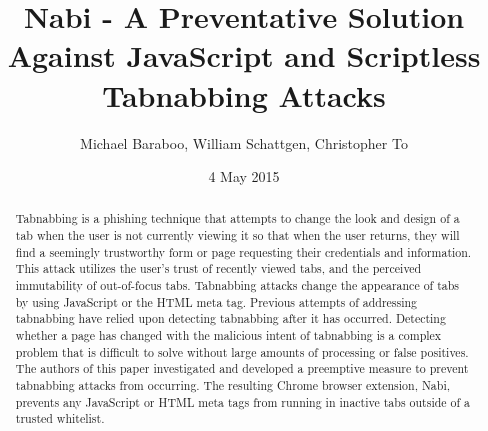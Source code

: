 \documentclass[12pt]{article}
\title{Nabi - A Preventative Solution Against JavaScript and Scriptless Tabnabbing Attacks}
\author{Michael Baraboo, William Schattgen, Christopher To}
\date{4 May 2015}
\begin{document}
\maketitle

\thispagestyle{empty}

\begin{abstract}
Tabnabbing is a phishing technique that attempts to change the look and design of a tab when the user is not currently viewing it so that when the user returns, they will find a seemingly trustworthy form or page requesting their credentials and information.  
This attack utilizes the user's trust of recently viewed tabs, and the perceived immutability of out-of-focus tabs.
Tabnabbing attacks change the appearance of tabs by using JavaScript or the HTML meta tag.  
Previous attempts of addressing tabnabbing have relied upon detecting tabnabbing after it has occurred.  
Detecting whether a page has changed with the malicious intent of tabnabbing is a complex problem that is difficult to solve without large amounts of processing or false positives.  
The authors of this paper investigated and developed a preemptive measure to prevent tabnabbing attacks from occurring.  
The resulting Chrome browser extension, Nabi, prevents any JavaScript or HTML meta tags from running in inactive tabs outside of a trusted whitelist.
\end{abstract}
\end{document}
